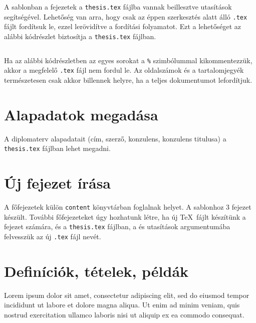 A sablonban a fejezetek a \verb+thesis.tex+ fájlba vannak beillesztve \verb++ utasítások segítségével. Lehetőség van arra, hogy csak az éppen szerkesztés alatt álló \verb+.tex+ fájlt fordítsuk le, ezzel lerövidítve a fordítási folyamatot. Ezt a lehetőséget az alábbi kódrészlet biztosítja a \verb+thesis.tex+ fájlban.
\begin{lstlisting}

\end{lstlisting}

Ha az alábbi kódrészletben az egyes sorokat a \verb+%+ szimbólummal kikommentezzük, akkor a megfelelő \verb+.tex+ fájl nem fordul le. Az oldalszámok és a tartalomjegyék természetesen csak akkor billennek helyre, ha a teljes dokumentumot lefordítjuk.

\newpage
\section{Alapadatok megadása}
A diplomaterv alapadatait (cím, szerző, konzulens, konzulens titulusa) a \verb+thesis.tex+ fájlban lehet megadni.

\section{Új fejezet írása}
A főfejezetek külön \verb+content+ könyvtárban foglalnak helyet. A sablonhoz 3 fejezet készült. További főfejezeteket úgy hozhatunk létre, ha új \TeX~fájlt készítünk a fejezet számára, és a \verb+thesis.tex+ fájlban, a \verb++ és \verb++ utasítások argumentumába felvesszük az új \verb+.tex+ fájl nevét.


\section{Definíciók, tételek, példák}

\begin{definition}
Lorem ipsum dolor sit amet, consectetur adipiscing elit, sed do eiusmod tempor incididunt ut labore et dolore magna aliqua. Ut enim ad minim veniam, quis nostrud exercitation ullamco laboris nisi ut aliquip ex ea commodo consequat.
\end{definition}

